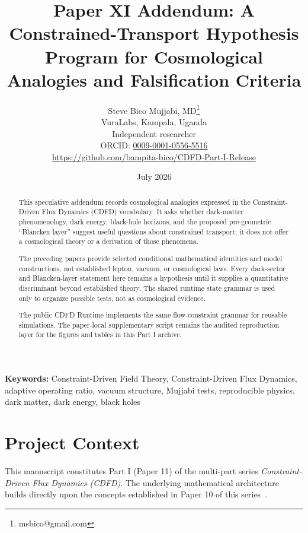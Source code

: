 \documentclass[11pt]{article}
\begin{document}
\title{Paper XI Addendum: A Constrained-Transport Hypothesis Program for Cosmological Analogies and Falsification Criteria}

\author{Steve Bico Mujjabi, MD\thanks{msbico@gmail.com}\\
VuraLabs, Kampala, Uganda\\
Independent researcher\\
ORCID: \href{https://orcid.org/0009-0001-0556-5516}{0009-0001-0556-5516}\\
\url{https://github.com/bampita-bico/CDFD-Part-I-Release}}

\date{July 2026}

\maketitle

\begin{abstract}
This speculative addendum records cosmological analogies expressed in the
Constraint-Driven Flux Dynamics (CDFD) vocabulary. It asks whether dark-matter
phenomenology, dark energy, black-hole horizons, and the proposed
pre-geometric ``Blancken layer'' suggest useful questions about constrained
transport; it does not offer a cosmological theory or a derivation of those
phenomena.

The preceding papers provide selected conditional mathematical identities and
model constructions, not established lepton, vacuum, or cosmological laws.
Every dark-sector and Blancken-layer statement here remains a hypothesis until
it supplies a quantitative discriminant beyond established theory. The shared
runtime state grammar is used only to organize possible tests, not as
cosmological evidence.

The public CDFD Runtime implements the same flow-constraint grammar for
reusable simulations. The paper-local supplementary script remains the audited
reproduction layer for the figures and tables in this Part I archive.
\end{abstract}

\noindent\textbf{Keywords:} Constraint-Driven Field Theory, Constraint-Driven Flux Dynamics, adaptive operating ratio, vacuum structure, Mujjabi tests, reproducible physics, dark matter, dark energy, black holes

\vspace{0.75em}
\linenumbers

\section*{Project Context}
This manuscript constitutes Part I (Paper 11) of the multi-part series
\textit{Constraint-Driven Flux Dynamics (CDFD)}. The underlying mathematical
architecture builds directly upon the concepts established in Paper 10 of this
series~\cite{MujjabiX2026}.
\end{document}
